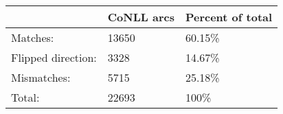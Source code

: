 	\begin{tabular}{|l|l|l|}
		\hline
		 & CoNLL arcs & Percent of total \\ 
		\hline
		Matches: & 13650 & 60.15\%\\ 
		\hline
		Flipped direction: & 3328 & 14.67\%\\ 
		\hline
		Mismatches: & 5715 & 25.18\%\\ 
		\hline
		Total: & 22693 & 100\% \\ 
		\hline
	\end{tabular}
